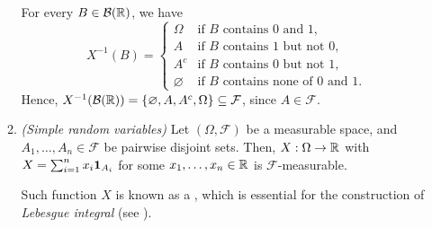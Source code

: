 \begin{enumerate}
\begin{enumerate}[label={(\arabic*)}]
\begin{pf}
For every \(B\in\mathcal{B}(\mathbb{R})\), we have
\[
X^{-1}(B)=\begin{cases}
\Omega&\text{if \(B\) contains \(0\) and \(1\),} \\
A&\text{if \(B\) contains \(1\) but not \(0\),} \\
A^c&\text{if \(B\) contains \(0\) but not \(1\),} \\
\varnothing&\text{if \(B\) contains none of \(0\) and \(1\).}
\end{cases}
\]
Hence, \(X^{-1}(\mathcal{B}(\mathbb{R}))=\{\varnothing,A,A^c,\Omega\}\subseteq \mathcal{F}\),
since \(A\in\mathcal{F}\).
\end{pf}
\item \emph{(Simple random variables)} Let \((\Omega,\mathcal{F})\) be a
measurable space, and \(A_1,\dotsc,A_n\in\mathcal{F}\) be pairwise disjoint
sets.  Then, \(X:\Omega\to\mathbb{R}\) with \(X=\sum_{i=1}^{n}x_i\mathbf{1}_{A_i}\) for
some \(x_1,\dotsc,x_n\in\mathbb{R}\) is \(\mathcal{F}\)-measurable. \begin{note}
Such function \(X\) is known as a , which is
essential for the construction of \emph{Lebesgue integral} (see
).
\end{note}


\end{enumerate}
\end{enumerate}
